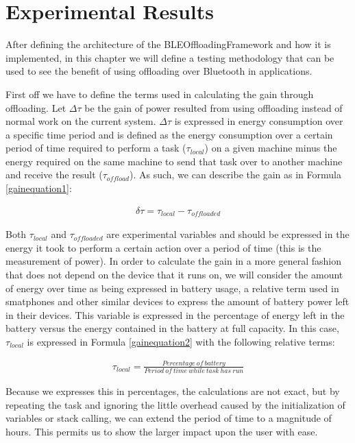 \chapter{Experimental Results}
\label{chapter:results}

After defining the architecture of the BLEOffloadingFramework and how it is implemented, in this chapter we will define a testing methodology that can be used to see the benefit of using offloading over Bluetooth in applications.

First off we have to define the terms used in calculating the gain through offloading. Let \(\Delta\tau\) be the gain of power resulted from using offloading instead of normal work on the current system. \(\Delta\tau\) is expressed in energy consumption over a specific time period and is defined as the energy consumption over a certain period of time required to perform a task (\(\tau_{local}\)) on a given machine minus the energy required on the same machine to send that task over to another machine and receive the result (\(\tau_{offload}\)). As such, we can describe the gain as in Formula \ref{gainequation1}:

\begin{align}\label{gainequation1}
\delta\tau = \tau_{local} - \tau_{offloaded}
\end{align}

Both \(\tau_{local}\) and \(\tau_{offloaded}\) are experimental variables and should be expressed in the energy it took to perform a certain action over a period of time (this is the measurement of power). In order to calculate the gain in a more general fashion that does not depend on the device that it runs on, we will consider the amount of energy over time as being expressed in battery usage, a relative term used in smatphones and other similar devices to express the amount of battery power left in their devices. This variable is expressed in the percentage of energy left in the battery versus the energy contained in the battery at full capacity. In this case, \(\tau_{local}\) is expressed in Formula \ref{gainequation2} with the following relative terms:

\begin{align}\label{gainequation2}
\tau_{local} = \tfrac{Percentage\ of\ battery}{Period\ of\ time\ while\ task\ has\ run}
\end{align}

Because we expresses this in percentages, the calculations are not exact, but by repeating the task and ignoring the little overhead caused by the initialization of variables or stack calling, we can extend the period of time to a magnitude of hours. This permits us to show the larger impact upon the user with ease.

